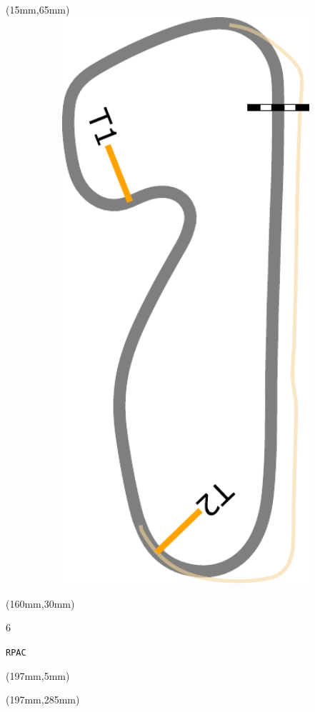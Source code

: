 \begin{textblock*}{185mm}(15mm,65mm)%
\centering
\mbox{\includegraphics[width=185mm,height=210mm,keepaspectratio]{PT/RPAC.pdf}}
\end{textblock*}
\begin{textblock*}{40mm}(160mm,30mm)%
\Large
\par{} 
\par6 
\par\hfill\tiny\tt RPAC\\
\end{textblock*}
\begin{textblock*}{20mm}(197mm,5mm)%
\fbox{\thepage}
\label{RPAC}
\end{textblock*}
\begin{textblock*}{20mm}(197mm,285mm)%
\fbox{\thepage}
\end{textblock*}

